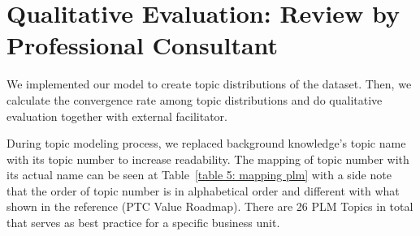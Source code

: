 \documentclass[senior]{IPSstyle}
\begin{document}
\section{Qualitative Evaluation: Review by Professional Consultant}

We implemented our model to create topic distributions of the dataset. Then, we calculate the convergence rate among topic distributions and do qualitative evaluation together with external facilitator.

During topic modeling process, we replaced background knowledge’s topic name with its topic number to increase readability. The mapping of topic number with its actual name can be seen at Table~\ref{table 5: mapping plm} with a side note that the order of topic number is in alphabetical order and different with what shown in the reference (PTC Value Roadmap). There are 26 PLM Topics in total that serves as best practice for a specific business unit.
\end{document}
